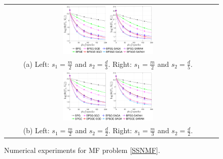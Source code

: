 \documentclass[letterpaper]{article} %
\begin{document}
	\begin{figure}[!ht]
		\centering
		\begin{tabular}{cc}
			\includegraphics[width=0.45\textwidth]{figs/ORL_epochs_23_25}\\
			(a) Left: $s_{1}=\frac{m}{2}$ and $s_{2}=\frac{d}{3}$. Right:  $s_{1}=\frac{m}{2}$ and $s_{2}=\frac{d}{5}$.\\
			\includegraphics[width=0.45\textwidth]{figs/ORL_epochs_22_32}\\
			(b) Left: $s_{1}=\frac{m}{2}$ and $s_{2}=\frac{d}{2}$. Right: $s_{1}=\frac{m}{3}$ and $s_{2}=\frac{d}{2}$.
		\end{tabular}
		\caption{Numerical experiments for MF  problem \eqref{SSNMF}. 
		}
		\label{SSNMF_epochs}
	\end{figure}
	
	
	
	
\end{document}
